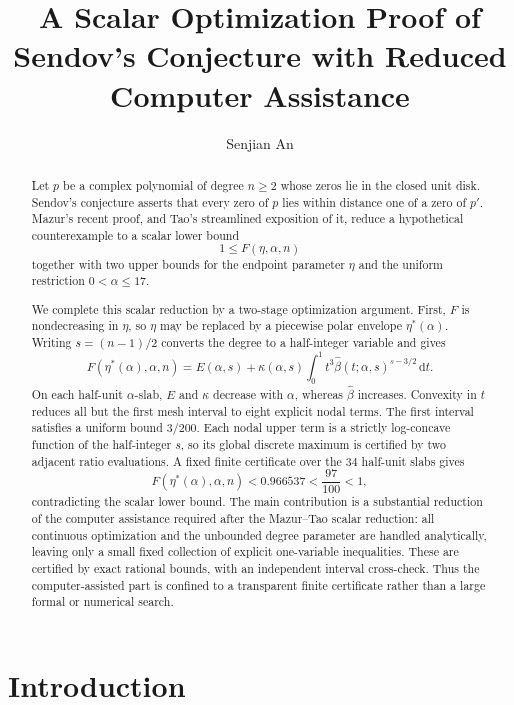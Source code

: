 \documentclass[11pt]{amsart}
\title[Scalar optimization proof of Sendov's conjecture]{A Scalar Optimization Proof of Sendov's Conjecture with Reduced Computer Assistance}
\author{Senjian An}
\date{}
\theoremstyle{definition}
\newcommand{\dd}{\,\mathrm d}
\begin{document}
\begin{abstract}
Let $p$ be a complex polynomial of degree $n\ge2$ whose zeros lie in the closed unit disk.  Sendov's conjecture asserts that every zero of $p$ lies within distance one of a zero of $p'$.  Mazur's recent proof, and Tao's streamlined exposition of it, reduce a hypothetical counterexample to a scalar lower bound
\[
  1\le F(\eta,\alpha,n)
\]
together with two upper bounds for the endpoint parameter $\eta$ and the uniform restriction $0<\alpha\le17$.

We complete this scalar reduction by a two-stage optimization argument.  First, $F$ is nondecreasing in $\eta$, so $\eta$ may be replaced by a piecewise polar envelope $\eta^{\ast}(\alpha)$.  Writing $s=(n-1)/2$ converts the degree to a half-integer variable and gives
\[
  F(\eta^{\ast}(\alpha),\alpha,n)
  =E(\alpha,s)+\kappa(\alpha,s)
   \int_0^1 t^3\widehat\beta(t;\alpha,s)^{s-3/2}\dd t.
\]
On each half-unit $\alpha$-slab, $E$ and $\kappa$ decrease with $\alpha$, whereas $\widehat\beta$ increases.  Convexity in $t$ reduces all but the first mesh interval to eight explicit nodal terms.  The first interval satisfies a uniform bound $3/200$.  Each nodal upper term is a strictly log-concave function of the half-integer $s$, so its global discrete maximum is certified by two adjacent ratio evaluations.  A fixed finite certificate over the $34$ half-unit slabs gives
\[
  F(\eta^{\ast}(\alpha),\alpha,n)<0.966537<\frac{97}{100}<1,
\]
contradicting the scalar lower bound.  The main contribution is a substantial reduction of the computer assistance required after the Mazur--Tao scalar reduction: all continuous optimization and the unbounded degree parameter are handled analytically, leaving only a small fixed collection of explicit one-variable inequalities.  These are certified by exact rational bounds, with an independent interval cross-check.  Thus the computer-assisted part is confined to a transparent finite certificate rather than a large formal or numerical search.
\end{abstract}

\maketitle
{}

\section{Introduction}\label{sec:introduction}
\end{document}
